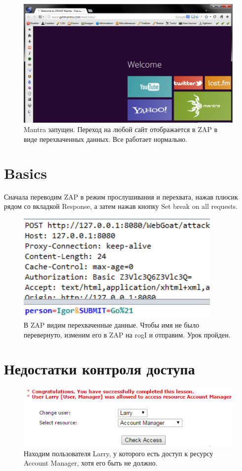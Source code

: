 \documentclass[utf8x, 12pt]{G7-32}
\begin{document}
\begin{figure}[hhh!]
\centering
\includegraphics[width=12cm]{rsrc/mantra_start}
\caption{Mantra запущен. Переход на любой сайт отображается в ZAP в виде перехваченных данных. Все работает нормально.}
\end{figure}

\newpage
\section{Basics}

Сначала переводим ZAP в режим прослушивания и перехвата, нажав плюсик рядом со вкладкой Response, а затем нажав кнопку Set break on all requests.


\begin{figure}[hhh!]
\centering
\includegraphics[width=10cm]{rsrc/1_2}
\caption{В ZAP видим перехваченные данные. Чтобы имя не было перевернуто, изменим его в ZAP на rogI и отправим. Урок пройден.}
\end{figure}


\newpage
\section{Недостатки контроля доступа}
\begin{figure}[hhh!]
\centering
\includegraphics[width=12cm]{rsrc/2_1}
\caption{Находим пользователя Larry, у которого есть доступ к ресурсу Account Manager, хотя его быть не должно.}
\end{figure}
\end{document}
